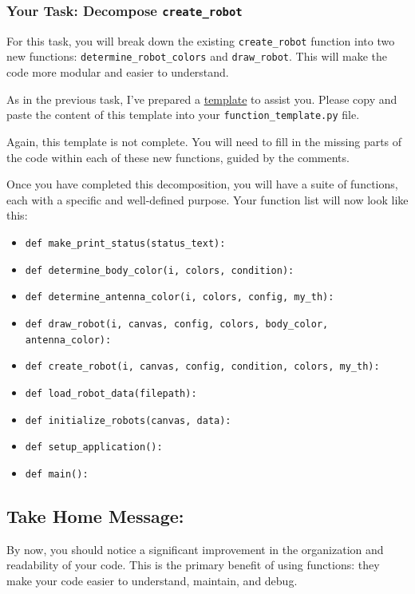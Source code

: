 \subsubsection{Your Task: Decompose \texttt{create\_robot}}
For this task, you will break down the existing \texttt{create\_robot} function into two new functions: \texttt{determine\_robot\_colors} and \texttt{draw\_robot}. This will make the code more modular and easier to understand.

As in the previous task, I've prepared a \href{https://github.com/balandongiv/computer_programming_gist/blob/main/session4/breaking_function_into_functions.txt}{template} to assist you. Please copy and paste the content of this template into your \texttt{function\_template.py} file.

Again, this template is not complete. You will need to fill in the missing parts of the code within each of these new functions, guided by the comments.

Once you have completed this decomposition, you will have a suite of functions, each with a specific and well-defined purpose. Your function list will now look like this:

\begin{itemize}\setlength{\itemsep}{5pt}
\item \texttt{def make\_print\_status(status\_text):}
\item \texttt{def determine\_body\_color(i, colors, condition):}
\item \texttt{def determine\_antenna\_color(i, colors, config, my\_th):}
\item \texttt{def draw\_robot(i, canvas, config, colors, body\_color, antenna\_color):}
\item \texttt{def create\_robot(i, canvas, config, condition, colors, my\_th):}
\item \texttt{def load\_robot\_data(filepath):}
\item \texttt{def initialize\_robots(canvas, data):}
\item \texttt{def setup\_application():}
\item \texttt{def main():}
\end{itemize}


\subsection{Take Home Message:}
By now, you should notice a significant improvement in the organization and readability of your code. This is the primary benefit of using functions: they make your code easier to understand, maintain, and debug.


